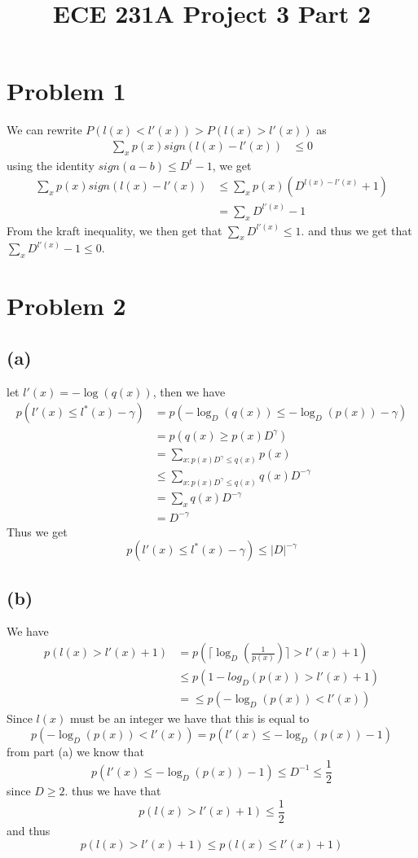 
\title{ECE 231A Project 3 Part 2}

\maketitle
\section*{Problem 1}
We can rewrite $P(l(x)<l'(x))>P(l(x)>l'(x))$ as
\begin{align*}
    \sum_{x} p(x)sign(l(x)-l'(x))&\leq 0
\end{align*}
using the identity $sign(a-b)\leq D^t-1$, we get
\begin{align*}
    \sum_{x} p(x)sign(l(x)-l'(x))&\leq \sum_{x} p(x)\left(D^{l(x)-l'(x)}+1\right)\\
    &=\sum_{x}D^{l'(x)}-1
\end{align*}
From the kraft inequality, we then get that $\sum_{x}D^{l'(x)}\leq 1$.
and thus we get that $\sum_{x}D^{l'(x)}-1\leq 0$.
\section*{Problem 2}
\subsection*{(a)}
let $l'(x)=-\log(q(x))$, then we have
\begin{align*}
    p(l'(x)\leq l^*(x)-\gamma)&=p(-\log_D(q(x))\leq -\log_D(p(x))-\gamma)\\
    &=p(q(x)\geq p(x)D^{\gamma})\\
    &=\sum_{x:p(x)D^{\gamma}\leq q(x)}p(x)\\
    &\leq \sum_{x:p(x)D^{\gamma}\leq q(x)}q(x)D^{-\gamma}\\
    &=\sum_{x}q(x)D^{-\gamma}\\
    &=D^{-\gamma}
\end{align*} 
Thus we get
$$
    p(l'(x)\leq l^*(x)-\gamma)\leq |D|^{-\gamma}$$   
\subsection*{(b)}
We have 
\begin{align*}
    p(l(x)>l'(x)+1)&=p\left(\lceil \log_D\left(\frac{1}{p(x)}\right)\rceil >l'(x)+1\right)\\
    &\leq p(1-log_D(p(x))>l'(x)+1)\\
    &=\leq p(-\log_D(p(x))<l'(x))
\end{align*}
Since $l(x)$ must be an integer we have that this is equal to 
$$p(-\log_D(p(x))<l'(x))=p(l'(x)\leq-\log_D(p(x))-1)$$
from part (a) we know that 
$$p(l'(x)\leq-\log_D(p(x))-1)\leq D^{-1}\leq \frac{1}{2}$$
since $D\geq 2$. thus we have that 
$$p(l(x)>l'(x)+1)\leq \frac{1}{2}$$
and thus 
$$p(l(x)>l'(x)+1)\leq p(l(x)\leq l'(x)+1)$$


